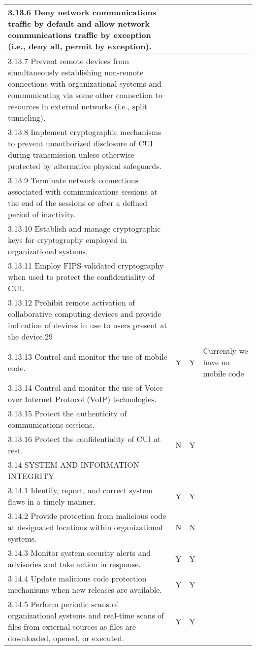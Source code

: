 \begin{longtable} {|p{}|p{}|p{}|p{} |}
{3.13.6 Deny network communications traffic by default and allow network communications traffic by exception (i.e., deny all, permit by exception).}&&& \\ \hline
{3.13.7 Prevent remote devices from simultaneously establishing non-remote connections with organizational systems and communicating via some other connection to resources in external networks (i.e., split tunneling).}&&& \\ \hline
{3.13.8 Implement cryptographic mechanisms to prevent unauthorized disclosure of CUI during transmission unless otherwise protected by alternative physical safeguards.}&&& \\ \hline
{3.13.9 Terminate network connections associated with communications sessions at the end of the sessions or after a defined period of inactivity.}&&& \\ \hline
{3.13.10 Establish and manage cryptographic keys for cryptography employed in organizational systems.}&&& \\ \hline
{3.13.11 Employ FIPS-validated cryptography when used to protect the confidentiality of CUI.}&&& \\ \hline
{3.13.12 Prohibit remote activation of collaborative computing devices and provide indication of devices in use to users present at the device.29}&&& \\ \hline
{3.13.13 Control and monitor the use of mobile code.}&{Y}&{Y}&{Currently we have no mobile code} \\ \hline
{3.13.14 Control and monitor the use of Voice over Internet Protocol (VoIP) technologies.}&&& \\ \hline
{3.13.15 Protect the authenticity of communications sessions.}&&& \\ \hline
{3.13.16 Protect the confidentiality of CUI at rest.}&{N}&{Y}& \\ \hline
{3.14 SYSTEM AND INFORMATION INTEGRITY}&&& \\ \hline
{3.14.1 Identify, report, and correct system flaws in a timely manner.}&{Y}&{Y}& \\ \hline
{3.14.2 Provide protection from malicious code at designated locations within organizational systems.}&{N}&{N}& \\ \hline
{3.14.3 Monitor system security alerts and advisories and take action in response.}&{Y}&{Y}& \\ \hline
{3.14.4 Update malicious code protection mechanisms when new releases are available.}&{Y}&{Y}& \\ \hline
{3.14.5 Perform periodic scans of organizational systems and real-time scans of files from external sources as files are downloaded, opened, or executed.}&{Y}&{Y}& \\ \hline

\end{longtable}
